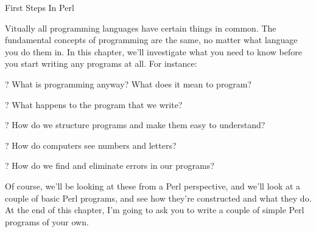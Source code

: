 \documentclass[a4paper,11pt]{book}
\begin{document}

\noindent 

\noindent 

\noindent 

\noindent 

\noindent 

\noindent 

\noindent 

\noindent 

\noindent 

\noindent 

\noindent 

\noindent 

\noindent 

\noindent 

\noindent 

\noindent First Steps In Perl

\noindent 

\noindent 

\noindent 

\noindent 

\noindent Vitually all programming languages have certain things in common. The fundamental concepts of programming are the same, no matter what language you do them in. In this chapter, we'll investigate what you need to know before you start writing any programs at all. For instance:

\noindent 

\noindent ? What is programming anyway? What does it mean to program?

\noindent 

\noindent ? What happens to the program that we write?

\noindent 

\noindent ? How do we structure programs and make them easy to understand?

\noindent 

\noindent ? How do computers see numbers and letters?

\noindent 

\noindent ? How do we find and eliminate errors in our programs?

\noindent 

\noindent Of course, we'll be looking at these from a Perl perspective, and we'll look at a couple of basic Perl programs, and see how they're constructed and what they do. At the end of this chapter, I'm going to ask you to write a couple of simple Perl programs of your own.
\end{document}
